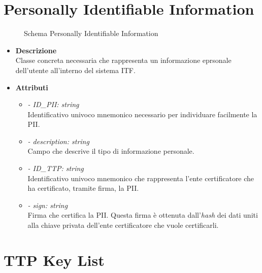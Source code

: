 \section{Personally Identifiable Information}
\begin{figure}[!h]
	\centering
	\caption{Schema Personally Identifiable Information}
\end{figure}
\begin{itemize}
	\item \textbf{Descrizione}\\
	Classe concreta necessaria che rappresenta un informazione eprsonale dell'utente all'interno del sistema \gls{ITF}.
	\item \textbf{Attributi}\\
	\begin{itemize}
		\item \textit{- ID\_PII: string}\\
		Identificativo univoco mnemonico necessario per individuare facilmente la \gls{PII}.
		\item \textit{- description: string}\\
		Campo che descrive il tipo di informazione personale.
		\item \textit{- ID\_TTP: string}\\
		Identificativo univoco mnemonico che rappresenta l'ente certificatore che ha certificato, tramite firma, la \gls{PII}.
		\item \textit{- sign: string}\\
		Firma che certifica la \gls{PII}. Questa firma è ottenuta dall'\textit{hash} dei dati uniti alla chiave privata dell'ente certificatore che vuole certificarli.
	\end{itemize}
\end{itemize}
\section{TTP Key List}
